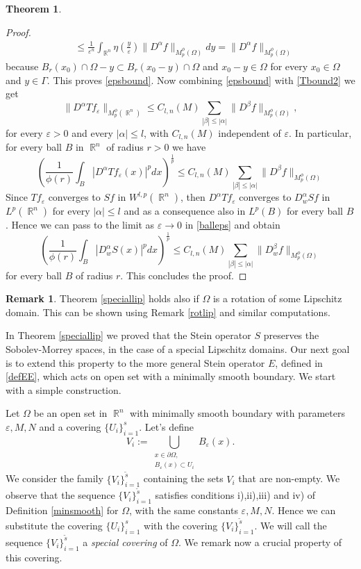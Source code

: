 \documentclass[12pt]{article}
\theoremstyle{definition}
\newtheorem{remark}{Remark}
\newtheorem{theorem}{Theorem}
\DeclareMathOperator\rr{\mathbb{R}}
\begin{document}
\begin{theorem}
\begin{proof}
\begin{align*}
 & \le \frac{1}{\varepsilon^n}  \int_{\rr^n} \eta\left(\frac{y}{\varepsilon} \right) \| D^\alpha f\|_{M_p^\phi(\Omega)} dy=\| D^\alpha f\|_{M_p^\phi(\Omega)}
\end{align*}
because $B_r(x_0)\cap \Omega -y \subset B_r(x_0-y)\cap \Omega$ and $x_0-y \in \Omega$ for every $x_0 \in \Omega$ and $y \in \Gamma.$ This proves \eqref{epsbound}. Now combining \eqref{epsbound} with \eqref{Tbound2} we get 
\[ \| D^\alpha Tf_\varepsilon\|_{M_p^\phi(\rr^n)}\le C_{l,n}(M)\sum_{|\beta|\le |\alpha|}\|D^\beta f \|_{M_p^\phi(\Omega)}, \]
for every $\varepsilon>0$ and every $|\alpha|\le l$, with $C_{l,n}(M)$ independent of $\varepsilon$. In particular, for every ball $B$ in $\rr^n$ of radius $r>0$ we have
\begin{equation}
\left( \frac{1}{\phi(r)}\int_B |D^\alpha Tf_\varepsilon(x)|^p dx \right)^\frac{1}{p} \le C_{l,n}(M)\sum_{|\beta|\le |\alpha|}\|D^\beta f \|_{M_p^\phi(\Omega)} \label{balleps}
\end{equation}
Since $ Tf_\varepsilon$ converges to $Sf$ in $W^{l,p}(\rr^n)$, then  $D^\alpha Tf_\varepsilon$ converges to $D^\alpha_w Sf$ in $L^p(\rr^n)$ for every $|\alpha|\le l$ and as a consequence also in $L^p(B)$ for every ball $B$. Hence we can pass to the limit as $\varepsilon \to 0$ in \eqref{balleps} and obtain
\[\left( \frac{1}{\phi(r)}\int_B |D^\alpha_w S(x)|^p dx \right)^\frac{1}{p} \le C_{l,n}(M)\sum_{|\beta|\le |\alpha|}\|D^\beta_w f \|_{M_p^\phi(\Omega)} \]
for every ball $B$ of radius $r.$ This concludes the proof.
 \end{proof} 
\end{theorem}

\begin{remark}
Theorem \ref{speciallip} holds also if $\Omega$ is a rotation of some Lipschitz domain. This can be shown using Remark \ref{rotlip} and similar computations.
\end{remark}
In Theorem \ref{speciallip} we proved that the Stein operator $S$ preserves the Sobolev-Morrey spaces, in the case of a special Lipschitz domains. Our next goal is to extend this property to the more general Stein operator $E$, defined in \eqref{defEE}, which acts on open set with a minimally smooth boundary. We start with a simple construction.


 Let $\Omega$ be an open set in $\rr^n$ with minimally smooth boundary with parameters $\varepsilon,M,N$ and a covering $\{ U_i\}_{i=1}^s.$ Let's define
\[V_i:=\bigcup_{\substack{x \in \partial\Omega, \\ B_\varepsilon(x) \subset U_i}}B_\varepsilon(x). \]
We consider the family $\{ V_i\}_{i=1}^{\widetilde s}$ containing the sets $V_i$ that are non-empty. We observe that the sequence $\{ V_i\}_{i=1}^{\widetilde s}$ satisfies conditions i),ii),iii) and iv) of Definition \ref{minsmooth} for $\Omega$, with the same constants $\varepsilon,M,N$. Hence we can substitute the covering $\{ U_i\}_{i=1}^s$ with the covering $\{ V_i\}_{i=1}^{\widetilde s}$. We will call the sequence $\{ V_i\}_{i=1}^{\widetilde s}$ a \textit{special covering} of $\Omega$. We remark now a crucial property of this covering.
\end{document}
